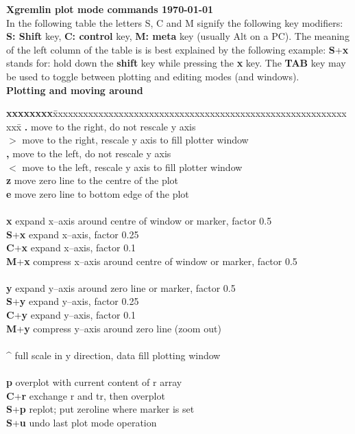 \documentclass[10pt]{article}
\def\key#1#2{\textbf{#1}+\textbf{#2}}
\begin{document}
\noindent
{\large {\bf Xgremlin plot mode commands \hfill \today}\\[1mm]

\noindent
In the following table the letters S, C and M signify the following
key modifiers: {\bf S: Shift} key, {\bf C: control} key, {\bf M: meta}
key (usually Alt on a PC).  The meaning of the left column of the
table is is best explained by the following example: \key{S}{x} stands
for: hold down the {\bf shift} key while pressing the {\bf x}
key. The {\bf TAB} key may be used to toggle between plotting and 
editing modes (and windows). \\[2mm]

\noindent
{\bf Plotting and moving around}
\begin{tabbing}
\textbf{xxxxxxxx}\=
xxxxxxxxxxxxxxxxxxxxxxxxxxxxxxxxxxxxxxxxxxxxxxxxxxxxxxxxxxxxx\= \kill
\textbf{.} 	\> 	  move to the right, do not rescale y axis\\
\textbf{$>$}    \>	  move  to the right, rescale y axis to fill plotter window\\
\textbf{,}	\>	  move to the left, do not rescale y axis\\
\textbf{$<$}	\>	  move to the left, rescale y axis to fill plotter window\\
\textbf{z}	\>	  move zero line to the centre of the plot\\
\textbf{e}	\>	  move zero line to bottom edge of the plot\\
		\>	  \\
\textbf{x}	\>	  expand x--axis around centre of window or marker, factor 0.5\\
\key{S}{x} 	\>        expand x--axis,  factor 0.25\\
\key{C}{x}	\>        expand x--axis, factor 0.1\\
\key{M}{x}	\>        compress x--axis around centre of window or marker, factor 0.5\\
		\>	  \\	
\textbf{y}	\>	  expand y--axis around zero line or marker, factor 0.5\\
\key{S}{y}	\>        expand y--axis, factor 0.25\\
\key{C}{y}	\>  	  expand y--axis, factor 0.1\\
\key{M}{y}	\>        compress y--axis around zero line (zoom out)\\
		\>	  \\	
\textbf{\^}	\>	  full scale in y direction, data fill plotting window\\
		\>	  \\	
\textbf{p}	\>        overplot with current content of r array\\
\key{C}{r}	\>        exchange r and tr, then overplot\\
\key{S}{p}	\>	  replot; put zeroline where marker is set\\
\key{S}{u}	\>	  undo last plot mode operation\\
\end{tabbing}

}
\end{document}
